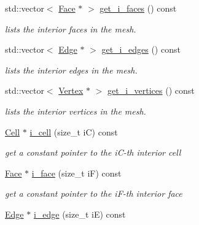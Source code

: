 \begin{DoxyCompactItemize}
std\+::vector$<$ \hyperlink{classHArDCore3D_1_1Face}{Face} $\ast$ $>$ \hyperlink{group__Mesh_ga3ec5d24146948a627e100e838de0f715}{get\+\_\+i\+\_\+faces} () const
\begin{DoxyCompactList}\small\item\em lists the interior faces in the mesh. \end{DoxyCompactList}\item 
std\+::vector$<$ \hyperlink{classHArDCore3D_1_1Edge}{Edge} $\ast$ $>$ \hyperlink{group__Mesh_gab47e764fd3660ad3b910d203a57ebfe3}{get\+\_\+i\+\_\+edges} () const
\begin{DoxyCompactList}\small\item\em lists the interior edges in the mesh. \end{DoxyCompactList}\item 
std\+::vector$<$ \hyperlink{classHArDCore3D_1_1Vertex}{Vertex} $\ast$ $>$ \hyperlink{group__Mesh_ga272a2fb7e29331652482190f45e30c02}{get\+\_\+i\+\_\+vertices} () const
\begin{DoxyCompactList}\small\item\em lists the interior vertices in the mesh. \end{DoxyCompactList}\item 
\mbox{\label{classHArDCore3D_1_1Mesh_aee5a30682d86cd7c130667fd4fdf395f}} 
\hyperlink{classHArDCore3D_1_1Cell}{Cell} $\ast$ \hyperlink{classHArDCore3D_1_1Mesh_aee5a30682d86cd7c130667fd4fdf395f}{i\+\_\+cell} (size\+\_\+t iC) const
\begin{DoxyCompactList}\small\item\em get a constant pointer to the i\+C-\/th interior cell \end{DoxyCompactList}\item 
\mbox{\label{classHArDCore3D_1_1Mesh_a7f346cc773f3bd0f884fa2057a151629}} 
\hyperlink{classHArDCore3D_1_1Face}{Face} $\ast$ \hyperlink{classHArDCore3D_1_1Mesh_a7f346cc773f3bd0f884fa2057a151629}{i\+\_\+face} (size\+\_\+t iF) const
\begin{DoxyCompactList}\small\item\em get a constant pointer to the i\+F-\/th interior face \end{DoxyCompactList}\item 
\mbox{\label{classHArDCore3D_1_1Mesh_acc84a2329361880a2f821d567149a1e8}} 
\hyperlink{classHArDCore3D_1_1Edge}{Edge} $\ast$ \hyperlink{classHArDCore3D_1_1Mesh_acc84a2329361880a2f821d567149a1e8}{i\+\_\+edge} (size\+\_\+t iE) const

\end{DoxyCompactItemize}
